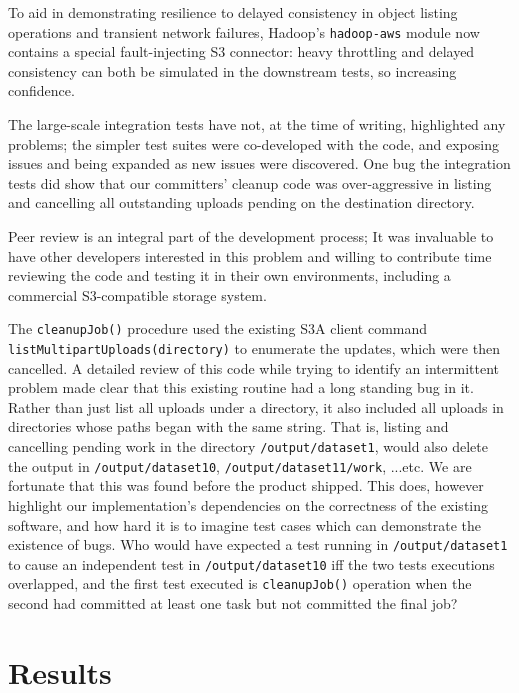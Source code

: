 \documentclass[conference]{IEEEtran}
\begin{document}
To aid in demonstrating resilience to delayed consistency in object listing
operations and transient network failures, Hadoop's \texttt{hadoop-aws} module
now contains a special fault-injecting S3 connector: heavy throttling and
delayed consistency can both be simulated in the downstream tests, so
increasing confidence.

The large-scale integration tests have not, at the time of writing, highlighted any problems;
the simpler test suites were co-developed with the code, and exposing issues and
being expanded as new issues were discovered.
One bug the integration tests did show that our committers' cleanup code was
over-aggressive in listing and cancelling all outstanding uploads pending
on the destination directory.

Peer review is an integral part of the development process;
It was invaluable to have other developers interested in this problem
and willing to contribute time reviewing the code and testing it
in their own environments, including a commercial S3-compatible
storage system.

The \texttt{cleanupJob()} procedure used the existing S3A client command
\texttt{listMultipartUploads(directory)} to enumerate the updates,
which were then cancelled.
A detailed review of this code while trying to identify an intermittent problem
made clear that this existing routine had a long standing bug in it.
Rather than just list all uploads under a directory, it also included
all uploads in directories whose paths began with the same string.
That is, listing and cancelling pending work in the directory \texttt{/output/dataset1},
would also delete the output in \texttt{/output/dataset10}, \texttt{/output/dataset11/work},
...etc.
We are fortunate that this was found before the product shipped.
This does, however highlight our implementation's dependencies on the correctness
of the existing software, and how hard it is to imagine test cases which
can demonstrate the existence of bugs.
Who would have expected a test running in \texttt{/output/dataset1} to
cause an independent test in \texttt{/output/dataset10} iff the two tests
executions overlapped, and the first test executed is \texttt{cleanupJob()}
operation when the second had committed at least one task but not committed
the final job?



\section{Results}
\label{sec:results}
\end{document}
